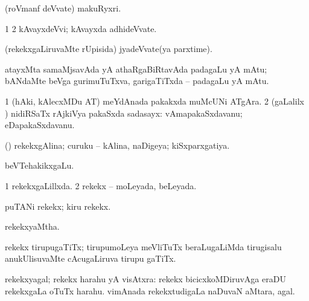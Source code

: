 {{{{{{\bentry
{}
 \gl{\nA}\bmng
(roVmanf deVvate) makuRyxri. 
\emng
\eentry

\bentry 
{}
 \gl{\nA}\bmng
\bnum
\num{1}  
\num{2} kAvayxdeVvi; kAvayxda adhideVvate. 
\enum
\emng
\eentry

\bentry
{}
 \gl{\nA}\bmng
(rekekxgaLiruvaMte rUpisida) jyadeVvate(ya parxtime). 
\emng
\eentry

\bentry
{}
 \gl{\nA}\bmng
atayxMta samaMjsavAda yA athaRgaBiRtavAda padagaLu yA mAtu; bANdaMte beVga gurimuTuTxva, garigaTiTxda -- padagaLu yA mAtu. 
\emng
\eentry

\bentry
{} 
\gl{\nA}
\expl{}
\bmng
\bnum
\num{1} (hAki, kAlecxMDu AT) meYdAnada pakakxda muMcUNi ATgAra. 
\num{2} (\saMpa gaLalilx \parx) nidiRSaTx rAjkiVya pakaSxda sadasayx:  vAmapakaSxdavanu; eDapakaSxdavanu. 
\enum
\emng
\eentry

\bentry
{}
  \gl{\gu}\bmng
(\kAparx) rekekxgAlina; curuku -- kAlina, naDigeya; kiSxparxgatiya. 
\emng
\eentry

\bentry
{}
  \gl{\nA}\bmng
beVTehakikxgaLu. 
\emng
\eentry

\bentry
{} 
\gl{\gu}
\expl{}
\bmng
\bnum
\num{1} rekekxgaLillxda. 
\num{2} rekekx -- moLeyada, beLeyada. 
\enum
\emng
\eentry

\bentry
{}
  \gl{\nA}\bmng
puTANi rekekx; kiru rekekx. 
\emng
\eentry

\bentry
{}
  \gl{\gu}\bmng
rekekxyaMtha. 
\emng
\eentry

\bentry
{}
  \gl{\nA}\bmng
rekekx tirupugaTiTx; tirupumoLeya meVliTuTx beraLugaLiMda tirugisalu anukUlisuvaMte cAcugaLiruva tirupu gaTiTx. 
\emng
\eentry

\bentry
{}
  \gl{\nA}\bmng
rekekxyagal; rekekx harahu yA visAtxra: 
\banum
{} rekekx bicicxkoMDiruvAga eraDU rekekxgaLa oTuTx harahu. 
 vimAnada rekekxtudigaLa naDuvaN aMtara, agal. 
\eanum
\emng
\eentry

\bentry
{}
  \gl{\nA}\bmng
{} 
\emng
\eentry

}}}}}}
